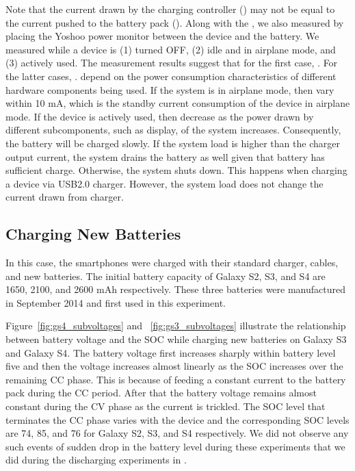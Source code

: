 \documentclass[journal]{IEEEtran}
\begin{document}
Note that the current drawn by the charging controller () may not be equal to the current pushed to the battery pack (). Along with the , we also measured  by placing the Yoshoo power monitor between the device and the battery. We measured  while a device is (1)  turned OFF, (2) idle and in airplane mode, and (3)  actively used. 
 The measurement results suggest that for the first case, . For the latter cases, .  depend on the power consumption characteristics of different hardware components being used. If the system is in airplane mode, then   vary within 10 mA, which is the standby current consumption of the device in airplane mode. If the device is actively used, then  decrease as the power drawn by different subcomponents, such as display, of the system increases. Consequently, the  battery will be charged slowly. If the system load is higher than the charger output current, the system drains the battery as well given  that battery has sufficient charge. Otherwise, the system shuts down. This happens when charging a device via USB2.0 charger. However, the system load does not change the current drawn from charger. 






\subsection{Charging New Batteries}
\label{sub:chargenew}
In this case, the smartphones were charged with their standard charger, cables, and new batteries. The initial battery capacity of Galaxy S2, S3, and S4 are 1650, 2100, and 2600 mAh respectively. These three batteries were manufactured in September 2014 and first used in this experiment. 

 


Figure~\ref{fig:gs4_subvoltages} and ~\ref{fig:gs3_subvoltages} illustrate the relationship between battery voltage and the SOC while charging new batteries on Galaxy S3 and Galaxy S4. The battery voltage first increases sharply within battery level five and then the voltage increases almost linearly as the SOC increases over the remaining CC phase. This is because of feeding a constant current to the battery pack during the CC period. After that the battery voltage remains almost constant during the CV phase as the current is trickled. The SOC level that terminates the CC phase varies with the device and the corresponding SOC levels are 74, 85, and 76 for Galaxy S2, S3, and S4 respectively. 
We did not observe any such events of sudden drop in the battery level during these experiments that we did during the discharging experiments in \cite{mhotpower2015}. 
\end{document}
